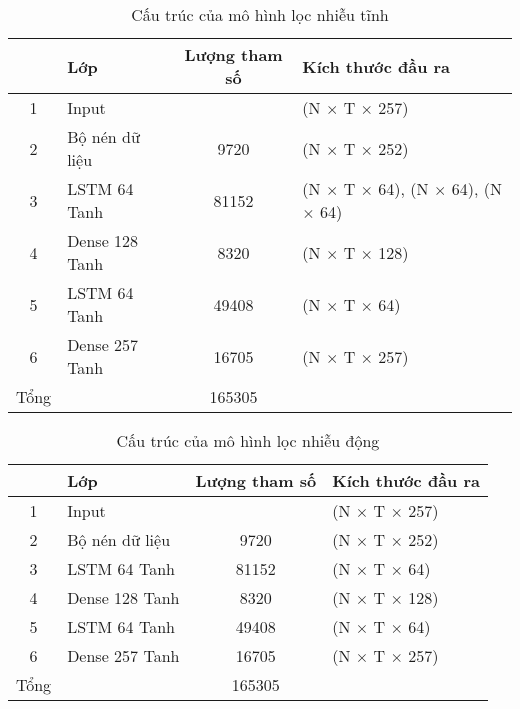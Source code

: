 				\begin{table}
					\centering
					\begin{tabular}{c l c l}
						\hline
						& \textbf{Lớp}		& \textbf{Lượng tham số}		& \textbf{Kích thước đầu ra} \\
						\hline
						1		& Input						&								& (N $\times$ T $\times$ 257) \\
						2		& Bộ nén dữ liệu			&	9720						& (N $\times$ T $\times$ 252) \\
						3		& LSTM 64 Tanh				&	81152						& (N $\times$ T $\times$ 64), (N $\times$ 64), (N $\times$ 64) \\
						4		& Dense 128 Tanh			&	8320						& (N $\times$ T $\times$ 128) \\
						5		& LSTM 64 Tanh				&	49408						& (N $\times$ T $\times$ 64) \\
						6		& Dense 257 Tanh			&	16705						& (N $\times$ T $\times$ 257) \\
						\hline
						Tổng	& 							&	165305						& \\
						\hline
					\end{tabular}
					\caption{Cấu trúc của mô hình lọc nhiễu tĩnh}
				\label{rl::static}
				\end{table}
			
				\begin{table}
					\centering
					\begin{tabular}{c l c l}
						\hline
						& \textbf{Lớp}		& \textbf{Lượng tham số}		& \textbf{Kích thước đầu ra} \\
						\hline
						1		& Input						&								& (N $\times$ T $\times$ 257) \\
						2		& Bộ nén dữ liệu			&	9720						& (N $\times$ T $\times$ 252) \\
						3		& LSTM 64 Tanh				&	81152						& (N $\times$ T $\times$ 64) \\
						4		& Dense 128 Tanh			&	8320						& (N $\times$ T $\times$ 128) \\
						5		& LSTM 64 Tanh				&	49408						& (N $\times$ T $\times$ 64) \\
						6		& Dense 257 Tanh			&	16705						& (N $\times$ T $\times$ 257) \\
						\hline
						Tổng	& 							&	165305						& \\
						\hline
					\end{tabular}
					\caption{Cấu trúc của mô hình lọc nhiễu động}
				\label{rl::dynamic}
				\end{table}
			
